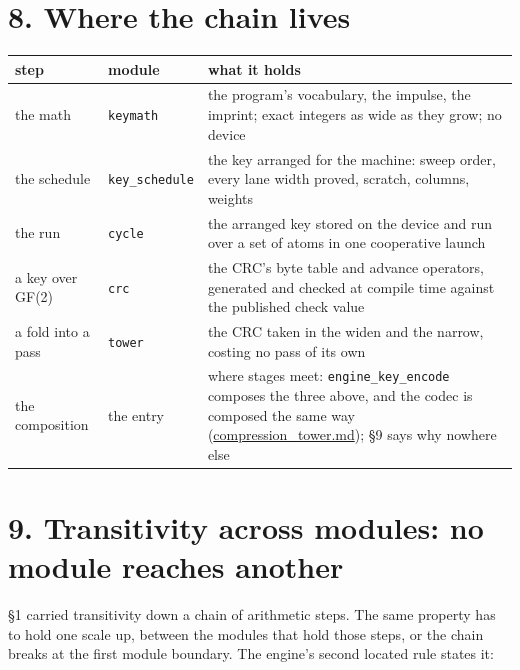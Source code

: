 \section{\texorpdfstring{8. Where the chain lives}{8. Where the chain lives}}

{\small
\setlength{\tabcolsep}{6pt}
\begin{longtable}{>{\RaggedRight\arraybackslash}p{}>{\RaggedRight\arraybackslash}p{}>{\RaggedRight\arraybackslash}p{}}
\toprule
step & module & what it holds \\
\midrule
\endhead
the math & \texttt{keymath} & the program's vocabulary, the impulse, the imprint; exact integers as wide as they grow; no device \\
the schedule & \texttt{key\_\allowbreak{}schedule} & the key arranged for the machine: sweep order, every lane width proved, scratch, columns, weights \\
the run & \texttt{cycle} & the arranged key stored on the device and run over a set of atoms in one cooperative launch \\
a key over GF(2) & \texttt{crc} & the CRC's byte table and advance operators, generated and checked at compile time against the published check value \\
a fold into a pass & \texttt{tower} & the CRC taken in the widen and the narrow, costing no pass of its own \\
the composition & the entry & where stages meet: \texttt{engine\_\allowbreak{}key\_\allowbreak{}encode} composes the three above, and the codec is composed the same way (\hyperref[chap:compression-tower]{compression\_\allowbreak{}tower.md}); §9 says why nowhere else \\
\bottomrule
\end{longtable}
}

\section{\texorpdfstring{9. Transitivity across modules: no module reaches another}{9. Transitivity across modules: no module reaches another}}

§1 carried transitivity down a chain of arithmetic steps. The same property has to hold one scale up, between the modules that hold those steps, or the chain breaks at the first module boundary. The engine's second located rule states it:

